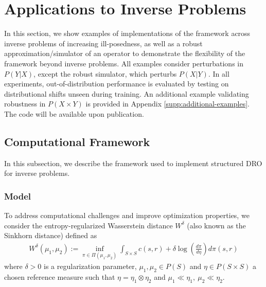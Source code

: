 \documentclass{article}
\theoremstyle{definition}
\theoremstyle{remarksty}
\begin{document}
\section{Applications to Inverse Problems}
In this section, we show examples of implementations of the framework across inverse problems of increasing ill-posedness, as well as a robust approximation/simulator of an operator to demonstrate the flexibility of the framework beyond inverse problems. All examples consider perturbations in $P(Y|X)$, except the robust simulator, which perturbs $P(X|Y)$. In all experiments, out-of-distribution performance is evaluated by testing on distributional shifts unseen during training. An additional example validating robustness in $P(X\times Y)$ is provided in Appendix \ref{supp:additional-examples}. The code will be available upon publication.

\subsection{Computational Framework} In this subsection, we describe the framework used to implement structured DRO for inverse problems.

\subsubsection{Model}\label{sec:s-duality}
To address computational challenges and improve optimization properties, we consider the entropy-regularized Wasserstein distance $W^\delta$ \cite{peyre_computational_2019, cuturi_sinkhorn_2013} (also known as the Sinkhorn distance) defined as 
\begin{align*}
    W^\delta (\mu_1, \mu_2) := \inf_{\pi \in \Pi(\mu_1, \mu_2)} \int_{S \times S} c(s,r) + \delta \log \left( \frac{d\pi}{d\eta} \right) d\pi(s,r) 
\end{align*}
where $\delta > 0$ is a regularization parameter, $\mu_1,\mu_2 \in P(S)$ and $\eta \in P(S \times S)$ a chosen reference measure such that $\eta = \eta_1\otimes \eta_2$ and $\mu_1 \ll \eta_1,\ \mu_2\ll \eta_2$.  
\end{document}

